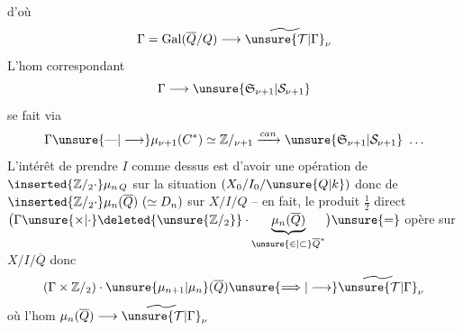 d'où
\[
\Gamma=\operatorname{Gal}(\overline Q/Q)\longrightarrow\widetilde{\unsure{\mathcal T|\Gamma}}_\nu
\]
L'hom correspondant
\[
\Gamma\longrightarrow\unsure{\mathfrak S_{\nu+1}|\mathcal S_{\nu+1}}
\]
se fait via
\[
\Gamma\unsure{\text{---}|\longrightarrow}\mu_{\nu+1}(C^*)\simeq \mathbb Z/_{\nu+1}\xrightarrow{can}\unsure{\mathfrak S_{\nu+1}|\mathcal S_{\nu+1}}\ \ldots
\]
L'intérêt de prendre $I$ comme
dessus est d'avoir une opération
de $\inserted{\mathbb Z/_{2}\cdot}\mu_{n\,Q}$  sur la situation
$(X_0/I_0/\unsure{Q|k})$ donc de $\inserted{\mathbb Z/_{2}\cdot}\mu_n(\overline Q)\ (\simeq D_n)$
sur $X/I/Q$ -- en fait, le
produit $\frac12$ direct $\bigl(\Gamma\unsure{\times|\cdot}\deleted{\unsure{\mathbb Z/_{2}}}\cdot\underbrace{\mu_n(\overline Q)}_{\unsure{\in|\subset}\overline Q^{*}}\bigr)\unsure{=}$
opère sur $X/I/\overline Q$ donc
\[
(\Gamma\times \mathbb Z/_{2})\cdot\unsure{\mu_{n+1}|\mu_n}(\overline Q)\unsure{\Longrightarrow|\longrightarrow}\widetilde{\unsure{\mathcal T|\Gamma}}_\nu
\]
où l'hom $\mu_n(\overline Q)\longrightarrow\widetilde{\unsure{\mathcal T|\Gamma}}_\nu$
